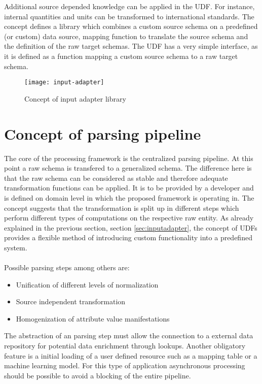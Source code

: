 Additional source depended knowledge can be applied in the UDF. For instance, internal quantities and units can be transformed to international standards. The concept defines a library which combines a custom source schema on a predefined (or custom) data source, mapping function to translate the source schema and the definition of the raw target schemas. The UDF has a very simple interface, as it is defined as a function mapping a custom source schema to a raw target schema. 

\begin{figure}[htb]
  \centering
  \texttt{[image: input-adapter]}\\
  \caption{Concept of input adapter library}
  \label{fig:inputadapter}
\end{figure}

\section{Concept of parsing pipeline\label{sec:ppln}}

The core of the processing framework is the centralized parsing pipeline. At this point a raw schema is transfered to a generalized schema. The difference here is that the raw schema can be considered as stable and therefore adequate transformation functions can be applied. It is to be provided by a developer and is defined on domain level in which the proposed framework is operating in. The concept suggests that the transformation is split up in different steps which perform different types of computations on the respective raw entity. As already explained in the previous section, section \ref{sec:inputadapter}, the concept of UDFs provides a flexible method of introducing custom functionality into a predefined system.
\\\\
Possible parsing steps among others are:
\begin{itemize}
\item Unification of different levels of normalization
\item Source independent transformation
\item Homogenization of attribute value manifestations
\end{itemize}

The abstraction of an parsing step must allow the connection to a external data repository for potential data enrichment through lookups. Another obligatory feature is a initial loading of a user defined resource such as a mapping table or a machine learning model. For this type of application asynchronous processing should be possible to avoid a blocking of the entire pipeline.

